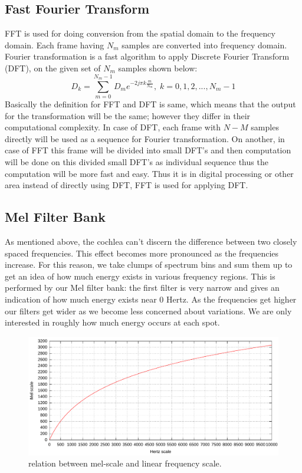\documentclass[12pt, a4paper, twoside]{report}
\begin{document}
\subsection{Fast Fourier Transform}
FFT is used for doing conversion from the spatial domain to the frequency domain. Each frame having $N_m$ samples are converted into frequency domain. Fourier transformation is a fast algorithm to apply Discrete Fourier Transform (DFT), on the given set of $N_m$ samples shown below:
\begin{equation}
D_k = \sum_{m=0}^{N_m -1}D_m e^{-2j\pi k\frac{m}{N_m}}, \; k=0,1,2,...,N_m - 1
\end{equation}
Basically the definition for FFT and DFT is same, which means that the output for the transformation will be the same; however they differ in their computational complexity. In case of DFT, each frame with $N-M$ samples directly will be used as a sequence for Fourier transformation. On another, in case of FFT this frame will be divided into small DFT’s and then computation will be done on this divided small   DFT’s  as  individual  sequence  thus  the  computation  will  be  more  fast  and  easy.  Thus  it  is  in digital processing or other area instead of directly using DFT, FFT is used for applying DFT.

\subsection{Mel Filter Bank}
As mentioned above, the cochlea can't discern the difference between two closely spaced frequencies. This effect becomes more pronounced as the frequencies increase. For this reason, we take clumps of spectrum bins and sum them up to get an idea of how much energy exists in various frequency regions. This is performed by our Mel filter bank: the first filter is very narrow and gives an indication of how much energy exists near 0 Hertz. As the frequencies get higher our filters get wider as we become less concerned about variations. We are only interested in roughly how much energy occurs at each spot.
\begin{figure}[!h]
	\centering
	\includegraphics[width=1\textwidth]
	{images/chapter3/mel-scale}
	\caption{relation between mel-scale and linear  frequency scale.}
	\label{fig:mel-scale}
\end{figure}
\end{document}
